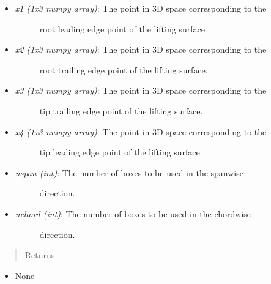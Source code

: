 \documentclass[letterpaper,10pt,english]{sphinxmanual}
\begin{document}
\begin{fulllineitems}
\begin{fulllineitems}
\begin{itemize}
\begin{description}
\end{description}

\item {} \begin{description}
\item[{\emph{x1 (1x3 numpy array)}: The point in 3D space corresponding to the}] \leavevmode
root leading edge point of the lifting surface.

\end{description}

\item {} \begin{description}
\item[{\emph{x2 (1x3 numpy array)}: The point in 3D space corresponding to the}] \leavevmode
root trailing edge point of the lifting surface.

\end{description}

\item {} \begin{description}
\item[{\emph{x3 (1x3 numpy array)}: The point in 3D space corresponding to the}] \leavevmode
tip trailing edge point of the lifting surface.

\end{description}

\item {} \begin{description}
\item[{\emph{x4 (1x3 numpy array)}: The point in 3D space corresponding to the}] \leavevmode
tip leading edge point of the lifting surface.

\end{description}

\item {} \begin{description}
\item[{\emph{nspan (int)}: The number of boxes to be used in the spanwise}] \leavevmode
direction.

\end{description}

\item {} \begin{description}
\item[{\emph{nchord (int)}: The number of boxes to be used in the chordwise}] \leavevmode
direction.

\end{description}

\end{itemize}
\begin{quote}\begin{description}
\item[{Returns}] \leavevmode
\end{description}\end{quote}
\begin{itemize}
\item {} 
None


\end{itemize}
\end{fulllineitems}
\end{fulllineitems}
\end{document}
